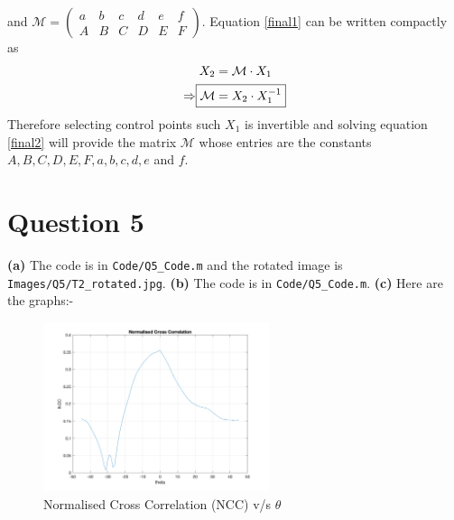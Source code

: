 \documentclass[12pt]{article}
\begin{document}
    and $\mathcal{M} = \begin{pmatrix}
        a & b & c & d & e & f \\
        A & B & C & D & E & F
    \end{pmatrix} $. Equation \ref{final1} can be written compactly as 
    \begin{align}
        X_{2} &= \mathcal{M} \cdot X_{1} \nonumber \\
        \Rightarrow \label{final2}\Aboxed{ \mathcal{M} &= X_{2} \cdot X_{1}^{-1}} 
    \end{align}
    Therefore selecting control points such $X_{1}$ is invertible and solving equation \ref{final2} will provide the 
    matrix $\mathcal{M}$ whose entries are the constants $A,B,C,D,E,F,a,b,c,d,e$ and $f$.
    \clearpage
\section*{Question 5}
    \vspace{-10pt}
    
    \textbf{(a)} The code is in \verb|Code/Q5_Code.m| and the rotated image is \verb|Images/Q5/T2_rotated.jpg|. \newline
    \textbf{(b)} The code is in \verb|Code/Q5_Code.m|. \newline
    \textbf{(c)} Here are the graphs:-
    
    \vspace{-13pt}
    
    \begin{figure}[H]
        \centering
        \includegraphics[width=0.59\textwidth]{Images/Q5/NCC.png}
        \vspace{-10pt}
        \caption{Normalised Cross Correlation (NCC) v/s $\theta$}
    \end{figure}
    
    \vspace{-25pt}
    
\end{document}
